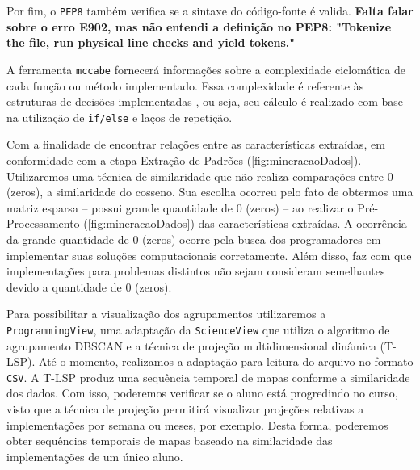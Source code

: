 	Por fim, o \texttt{PEP8} também verifica se a sintaxe do código-fonte é valida.
	\textbf{Falta falar sobre o erro E902, mas não entendi a definição no PEP8:
		"Tokenize the file, run physical line checks and yield tokens."}
	
	A ferramenta \texttt{mccabe} \cite{mccabe2013} fornecerá informações sobre a
	complexidade ciclomática \cite{mccabe} de cada função ou método implementado.
	Essa complexidade é referente às estruturas de decisões implementadas \cite{mccabe},
	ou seja, seu cálculo é realizado com base na utilização de \texttt{if/else} e laços
	de repetição.
	
	Com a finalidade de encontrar relações entre as características extraídas, em
	conformidade com a etapa Extração de Padrões (\ref{fig:mineracaoDados}).
	Utilizaremos uma técnica de similaridade que não realiza comparações entre 0
	(zeros), a similaridade do cosseno. Sua escolha ocorreu pelo fato de obtermos
	uma matriz esparsa -- possui grande quantidade de 0 (zeros) -- ao realizar o
	Pré-Processamento (\ref{fig:mineracaoDados}) das características extraídas. A
	ocorrência da grande quantidade de 0 (zeros) ocorre pela busca dos programadores
	em implementar suas soluções computacionais corretamente. Além disso, faz com que
	implementações para problemas distintos não sejam consideram semelhantes devido a
	quantidade de 0 (zeros).
	
	Para possibilitar a visualização dos agrupamentos utilizaremos a \texttt{ProgrammingView},
	uma adaptação da \texttt{ScienceView} \cite{Alencar} que utiliza o algoritmo de
	agrupamento DBSCAN \cite{Ester1996} e a técnica de projeção multidimensional dinâmica
	 (T-LSP). Até o momento, realizamos a
	adaptação para leitura do arquivo no formato \texttt{CSV}. A T-LSP produz uma sequência
	temporal de mapas conforme a similaridade dos dados. Com isso, poderemos verificar se
	o aluno está progredindo no curso, visto que a técnica de projeção permitirá visualizar
	projeções relativas a implementações por semana ou meses, por exemplo. Desta forma, poderemos
	obter sequências temporais de mapas baseado na similaridade das implementações de um único
	aluno.
	
	